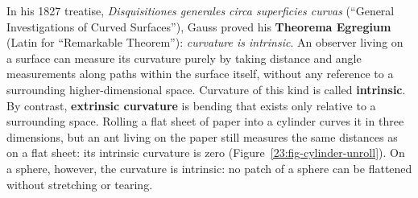 In his 1827 treatise, \emph{Disquisitiones generales circa superficies curvas} (``General Investigations of Curved Surfaces''), Gauss proved his \textbf{Theorema Egregium} (Latin for ``Remarkable Theorem''): \emph{curvature is intrinsic}. An observer living on a surface can measure its curvature purely by taking distance and angle measurements along paths within the surface itself, without any reference to a surrounding higher-dimensional space. Curvature of this kind is called \textbf{intrinsic}. By contrast, \textbf{extrinsic curvature} is bending that exists only relative to a surrounding space. Rolling a flat sheet of paper into a cylinder curves it in three dimensions, but an ant living on the paper still measures the same distances as on a flat sheet: its intrinsic curvature is zero (Figure~\ref{23:fig-cylinder-unroll}). On a sphere, however, the curvature is intrinsic: no patch of a sphere can be flattened without stretching or tearing.

